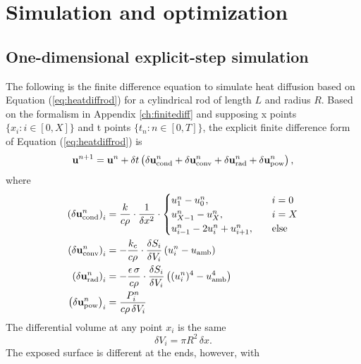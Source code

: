 \documentclass[letterpaper,titlepage,oneside]{report}
\begin{document}
\chapter{Simulation and optimization}
\label{ch:simulation}

\section{One-dimensional explicit-step simulation}

The following is the finite difference equation
to simulate heat diffusion based on
Equation (\ref{eq:heatdiffrod}) for a cylindrical rod of
length $L$ and radius $R$. Based on the formalism in
Appendix \ref{ch:finitediff} and supposing x points
$\{x_i:i\in[0,X]\}$ and t points $\{t_n:n\in[0,T]\}$,
the explicit finite difference form
of Equation (\ref{eq:heatdiffrod}) is
\begin{equation}\label{eq:finitediffrod}
  \mathbf{u}^{n+1} = \mathbf{u}^n + \delta t \left(
  \delta\mathbf{u}_{\rm{cond}}^n +
  \delta\mathbf{u}_{\rm{conv}}^n +
  \delta\mathbf{u}_{\rm{rad}}^n +
  \delta\mathbf{u}_{\rm{pow}}^n \right),
\end{equation}
where
\begin{align*}
    \left(\delta \mathbf{u}_{\rm{cond}}^n\right)_i &=
    \frac{k}{c\rho}\cdot\frac{1}{\delta x^2}\cdot
    \begin{cases}
      u_1^n-u_0^n, & \quad i=0\\
      u_{X-1}^n-u_X^n, & \quad i=X\\
      u_{i-1}^n-2u_i^n+u_{i+1}^n, & \quad \text{else}\\
    \end{cases}
    \\
    \left(\delta \mathbf{u}_{\rm{conv}}^n\right)_i &=
    -\frac{k_c}{c\rho}\cdot\frac{\delta S_i}{\delta V_i}
    \left(u_i^n-u_{\rm{amb}}\right)
    \\
    \left(\delta \mathbf{u}_{\rm{rad}}^n\right)_i &=
    -\frac{\epsilon\,\sigma}{c\rho}\cdot\frac{\delta S_i}{\delta V_i}
    \left((u_i^n)^4-u_{\rm{amb}}^4\right)
    \\
    \left(\delta \mathbf{u}_{\rm{pow}}^n\right)_i &=
    \frac{P_i^n}{c\rho\,\delta V_i}
\end{align*}
The differential volume at any point $x_i$ is the same
\begin{equation*}
  \delta V_i = \pi R^2\,\delta x.
\end{equation*}
The exposed surface is different at the ends, however, with
\end{document}
